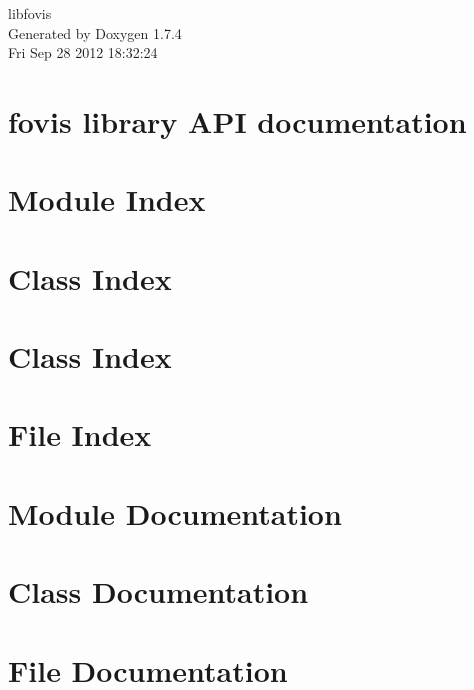 \documentclass[a4paper]{book}
\begin{document}
\hypersetup{pageanchor=false}
\begin{titlepage}
\vspace*{7cm}
\begin{center}
{\Large libfovis }\\
\vspace*{1cm}
{\large Generated by Doxygen 1.7.4}\\
\vspace*{0.5cm}
{\small Fri Sep 28 2012 18:32:24}\\
\end{center}
\end{titlepage}
\clearemptydoublepage
{}
\tableofcontents
\clearemptydoublepage
{}
\hypersetup{pageanchor=true}
\chapter{fovis library API documentation}
\label{index}\hypertarget{index}{}
\chapter{Module Index}

\chapter{Class Index}

\chapter{Class Index}

\chapter{File Index}

\chapter{Module Documentation}


\chapter{Class Documentation}























\chapter{File Documentation}

\printindex
\end{document}
